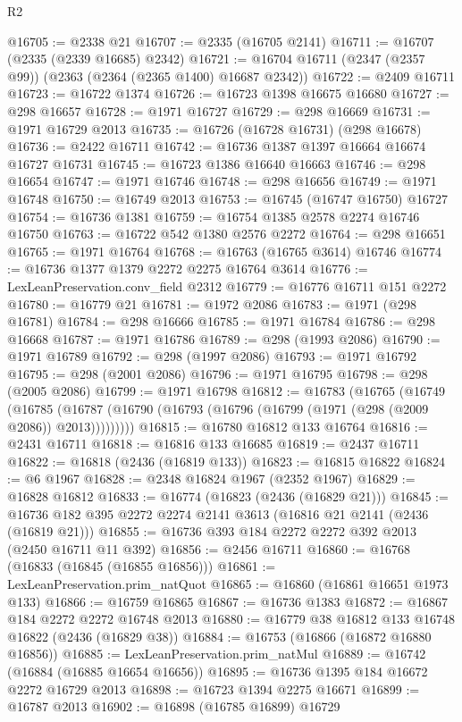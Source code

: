 \begin{lexlean}{R2}
\begin{coremodule}
@16705 := @2338 @21
@16707 := @2335 (@16705 @2141)
@16711 := @16707 (@2335 (@2339 @16685) @2342)
@16721 := @16704 @16711 (@2347 (@2357 @99)) (@2363 (@2364 (@2365 @1400) @16687 @2342))
@16722 := @2409 @16711
@16723 := @16722 @1374
@16726 := @16723 @1398 @16675 @16680
@16727 := @298 @16657
@16728 := @1971 @16727
@16729 := @298 @16669
@16731 := @1971 @16729 @2013
@16735 := @16726 (@16728 @16731) (@298 @16678)
@16736 := @2422 @16711
@16742 := @16736 @1387 @1397 @16664 @16674 @16727 @16731
@16745 := @16723 @1386 @16640 @16663
@16746 := @298 @16654
@16747 := @1971 @16746
@16748 := @298 @16656
@16749 := @1971 @16748
@16750 := @16749 @2013
@16753 := @16745 (@16747 @16750) @16727
@16754 := @16736 @1381
@16759 := @16754 @1385 @2578 @2274 @16746 @16750
@16763 := @16722 @542 @1380 @2576 @2272
@16764 := @298 @16651
@16765 := @1971 @16764
@16768 := @16763 (@16765 @3614) @16746
@16774 := @16736 @1377 @1379 @2272 @2275 @16764 @3614
@16776 := LexLeanPreservation.conv_field @2312
@16779 := @16776 @16711 @151 @2272
@16780 := @16779 @21
@16781 := @1972 @2086
@16783 := @1971 (@298 @16781)
@16784 := @298 @16666
@16785 := @1971 @16784
@16786 := @298 @16668
@16787 := @1971 @16786
@16789 := @298 (@1993 @2086)
@16790 := @1971 @16789
@16792 := @298 (@1997 @2086)
@16793 := @1971 @16792
@16795 := @298 (@2001 @2086)
@16796 := @1971 @16795
@16798 := @298 (@2005 @2086)
@16799 := @1971 @16798
@16812 := @16783
    (@16765
      (@16749
        (@16785 (@16787 (@16790 (@16793 (@16796 (@16799 (@1971 (@298 (@2009 @2086)) @2013)))))))))
@16815 := @16780 @16812 @133 @16764
@16816 := @2431 @16711
@16818 := @16816 @133 @16685
@16819 := @2437 @16711
@16822 := @16818 (@2436 (@16819 @133))
@16823 := @16815 @16822
@16824 := @6 @1967
@16828 := @2348 @16824 @1967 (@2352 @1967)
@16829 := @16828 @16812
@16833 := @16774 (@16823 (@2436 (@16829 @21)))
@16845 := @16736 @182 @395 @2272 @2274 @2141 @3613 (@16816 @21 @2141 (@2436 (@16819 @21)))
@16855 := @16736 @393 @184 @2272 @2272 @392 @2013 (@2450 @16711 @11 @392)
@16856 := @2456 @16711
@16860 := @16768 (@16833 (@16845 (@16855 @16856)))
@16861 := LexLeanPreservation.prim_natQuot
@16865 := @16860 (@16861 @16651 @1973 @133)
@16866 := @16759 @16865
@16867 := @16736 @1383
@16872 := @16867 @184 @2272 @2272 @16748 @2013
@16880 := @16779 @38 @16812 @133 @16748 @16822 (@2436 (@16829 @38))
@16884 := @16753 (@16866 (@16872 @16880 @16856))
@16885 := LexLeanPreservation.prim_natMul
@16889 := @16742 (@16884 (@16885 @16654 @16656))
@16895 := @16736 @1395 @184 @16672 @2272 @16729 @2013
@16898 := @16723 @1394 @2275 @16671
@16899 := @16787 @2013
@16902 := @16898 (@16785 @16899) @16729

\end{coremodule}
\end{lexlean}
